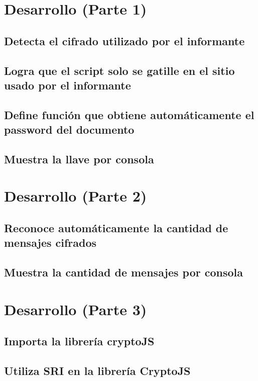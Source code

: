 \documentclass[letter,12pt]{article}
\begin{document}
\section{Desarrollo (Parte 1)}
\subsection{Detecta el cifrado utilizado por el informante}
\subsection{Logra que el script solo se gatille en el sitio usado por el informante}
\subsection{Define función que obtiene automáticamente el password del documento}
\subsection{Muestra la llave por consola}

\section{Desarrollo (Parte 2)}

\subsection{Reconoce automáticamente la cantidad de mensajes cifrados}

\subsection{Muestra la cantidad de mensajes por consola}

\section{Desarrollo (Parte 3)}

\subsection{Importa la librería cryptoJS}

\subsection{Utiliza SRI en la librería CryptoJS}
\end{document}
